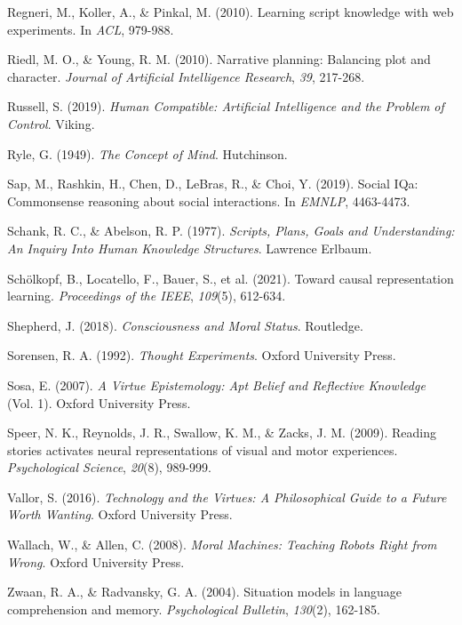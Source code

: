 \documentclass[12pt]{article}
\begin{document}
\begin{thebibliography}{99}
Regneri, M., Koller, A., \& Pinkal, M. (2010). Learning script knowledge with web experiments. In \textit{ACL}, 979-988.

Riedl, M. O., \& Young, R. M. (2010). Narrative planning: Balancing plot and character. \textit{Journal of Artificial Intelligence Research}, \textit{39}, 217-268.

Russell, S. (2019). \textit{Human Compatible: Artificial Intelligence and the Problem of Control}. Viking.

Ryle, G. (1949). \textit{The Concept of Mind}. Hutchinson.

Sap, M., Rashkin, H., Chen, D., LeBras, R., \& Choi, Y. (2019). Social IQa: Commonsense reasoning about social interactions. In \textit{EMNLP}, 4463-4473.

Schank, R. C., \& Abelson, R. P. (1977). \textit{Scripts, Plans, Goals and Understanding: An Inquiry Into Human Knowledge Structures}. Lawrence Erlbaum.

Schölkopf, B., Locatello, F., Bauer, S., et al. (2021). Toward causal representation learning. \textit{Proceedings of the IEEE}, \textit{109}(5), 612-634.

Shepherd, J. (2018). \textit{Consciousness and Moral Status}. Routledge.

Sorensen, R. A. (1992). \textit{Thought Experiments}. Oxford University Press.

Sosa, E. (2007). \textit{A Virtue Epistemology: Apt Belief and Reflective Knowledge} (Vol. 1). Oxford University Press.

Speer, N. K., Reynolds, J. R., Swallow, K. M., \& Zacks, J. M. (2009). Reading stories activates neural representations of visual and motor experiences. \textit{Psychological Science}, \textit{20}(8), 989-999.

Vallor, S. (2016). \textit{Technology and the Virtues: A Philosophical Guide to a Future Worth Wanting}. Oxford University Press.

Wallach, W., \& Allen, C. (2008). \textit{Moral Machines: Teaching Robots Right from Wrong}. Oxford University Press.

Zwaan, R. A., \& Radvansky, G. A. (2004). Situation models in language comprehension and memory. \textit{Psychological Bulletin}, \textit{130}(2), 162-185.

\end{thebibliography}
\end{document}
